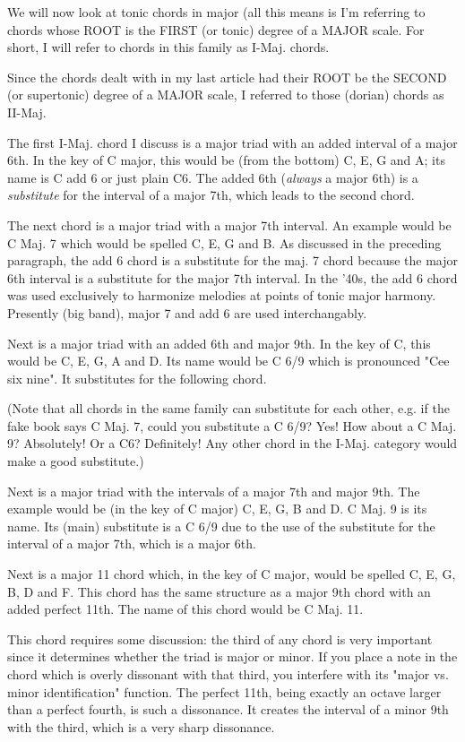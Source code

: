 We will now look at tonic chords in major (all this means is I'm 
referring to chords whose ROOT is the FIRST (or tonic) degree of a MAJOR 
scale. For short, I will refer to chords in this family as I-Maj. chords. 

Since the chords dealt with in my last article had their ROOT be the SECOND 
(or supertonic) degree of a MAJOR scale, I referred to those (dorian) chords 
as II-Maj.

The first I-Maj. chord I discuss is a major triad with an added interval 
of a major 6th. In the key of C major, this would be (from the bottom) 
C, E, G and A; its name is C add 6 or just plain C6. The added 6th (\emph{always} 
a major 6th) is a \emph{substitute} for the interval of a major 7th, which leads 
to the second chord.

The next chord is a major triad with a major 7th interval. An example 
would be C Maj. 7 which would be spelled C, E, G and B. As discussed in 
the preceding paragraph, the add 6 chord is a substitute for the maj. 7 
chord because the major 6th interval is a substitute for the major 7th 
interval. In the '40s, the add 6 chord was used exclusively to harmonize 
melodies at points of tonic major harmony. Presently (big band), major 7 
and add 6 are used interchangably. 

Next is a major triad with an added 6th and major 9th. In the key of C, 
this would be C, E, G, A and D. Its name would be C 6/9 which is 
pronounced "Cee six nine". It substitutes for the following chord.

(Note that all chords in the same family can substitute for each other, 
e.g. if the fake book says C Maj. 7, could you substitute a C 6/9? Yes! 
How about a C Maj. 9? Absolutely! Or a C6? Definitely! Any other chord in 
the I-Maj. category would make a good substitute.)

Next is a major triad with the intervals of a major 7th and major 9th. 
The example would be (in the key of C major) C, E, G, B and D. C Maj. 9 
is its name. Its (main) substitute is a C 6/9 due to the use of the
substitute for the interval of a major 7th, which is a major 6th.

Next is a major 11 chord which, in the key of C major, would be spelled 
C, E, G, B, D and F. This chord has the same structure as a major 9th 
chord with an added perfect 11th. The name of this chord would be C Maj. 11. 

This chord requires some discussion: the third of any chord is very 
important since it determines whether the triad is major or minor. 
If you place a note in the chord which is overly dissonant with that 
third, you interfere with its "major vs. minor identification" function. 
The perfect 11th, being exactly an octave larger than a perfect fourth, 
is such a dissonance. It creates the interval of a minor 9th with the 
third, which is a very sharp dissonance.

